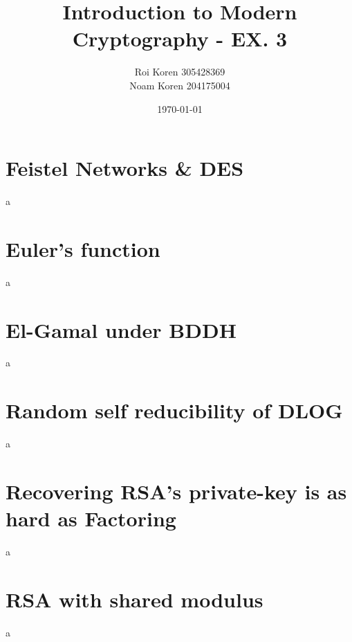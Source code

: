 \documentclass{article}
\begin{document}
\title{Introduction to Modern Cryptography - EX. 3}
\author{Roi Koren 305428369\\ Noam Koren 204175004}
\date{\today}
\maketitle
\newpage
{}

\section{Feistel Networks \& DES}
\begin{paragraph}
	a 
\end{paragraph}

\section{Euler's function}
\begin{paragraph}
	a
\end{paragraph}

\section{El-Gamal under BDDH}
\begin{paragraph}
	a 
\end{paragraph}

\section{Random self reducibility of DLOG}
\begin{paragraph}
	a 
\end{paragraph}

\section{Recovering RSA's private-key is as hard as Factoring}
\begin{paragraph}
	a 
\end{paragraph}

\section{RSA with shared modulus}
\begin{paragraph}
	a 
\end{paragraph}
\end{document}
